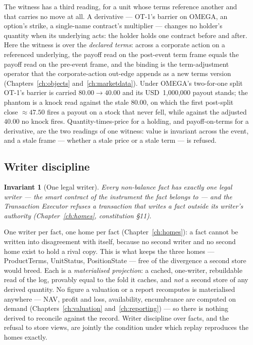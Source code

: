 \documentclass[11pt,a4paper]{article}
\newcommand{\USD}[1]{\mbox{USD~#1}}
\newtheorem{invariant}[definition]{Invariant}
\begin{document}
The witness has a third reading, for a unit whose terms reference another and that carries
no move at all. A derivative --- OT-1's barrier on OMEGA, an option's strike, a single-name
contract's multiplier --- changes no holder's quantity when its underlying acts: the holder
holds one contract before and after. Here the witness is over the \emph{declared terms}:
across a corporate action on a referenced underlying, the payoff read on the post-event term
frame equals the payoff read on the pre-event frame, and the binding is the term-adjustment
operator that the corporate-action out-edge appends as a new terms version
(Chapters~\ref{ch:objects} and~\ref{ch:marketdata}). Under OMEGA's two-for-one split OT-1's
barrier is carried $80.00 \rightarrow 40.00$ and its \USD{1{,}000{,}000} payout stands; the
phantom is a knock read against the stale $80.00$, on which the first post-split close
$\approx 47.50$ fires a payout on a stock that never fell, while against the adjusted $40.00$
no knock fires. Quantity-times-price for a holding, and payoff-on-terms for a derivative, are
the two readings of one witness: value is invariant across the event, and a stale frame ---
whether a stale price or a stale term --- is refused.

\subsection{Writer discipline}

\begin{invariant}[One legal writer]\label{inv:writer}
Every non-balance fact has exactly one legal writer --- the smart contract of the
instrument the fact belongs to --- and the Transaction Executor refuses a
transaction that writes a fact outside its writer's authority
(Chapter~\ref{ch:homes}, constitution \S 11).
\end{invariant}

One writer per fact, one home per fact (Chapter~\ref{ch:homes}): a fact cannot be
written into disagreement with itself, because no second writer and no second home
exist to hold a rival copy. This is what keeps the three homes ---
ProductTerms, UnitStatus, PositionState --- free of the divergence a second store
would breed. Each is a \emph{materialised projection}: a cached, one-writer,
rebuildable read of the log, provably equal to the fold it caches, and \emph{not}
a second store of any derived quantity. No figure a valuation or a report
recomputes is materialised anywhere --- NAV, profit and loss, availability,
encumbrance are computed on demand (Chapters~\ref{ch:valuation}
and~\ref{ch:reporting}) --- so there is nothing derived to reconcile against the
record. Writer discipline over facts, and the refusal to store views, are jointly
the condition under which replay reproduces the homes exactly.
\end{document}
